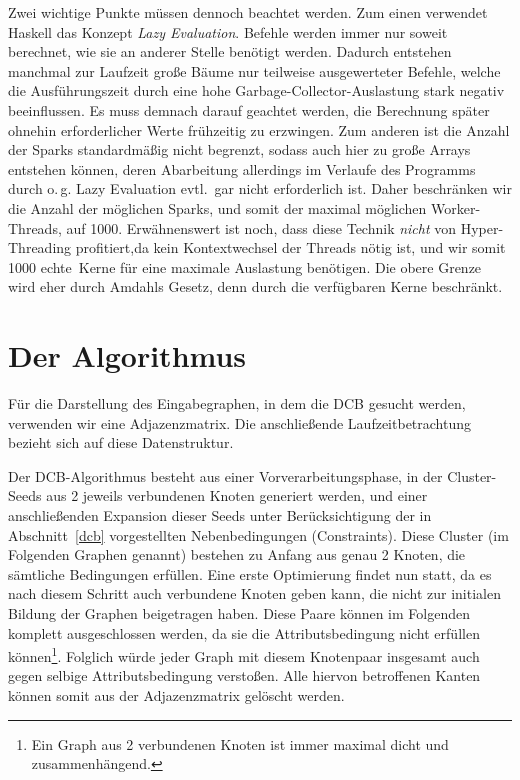 \documentclass[a4paper]{scrartcl}
\newcommand{\en}[1]{\selectlanguage{USenglish}#1\selectlanguage{ngerman}}
\begin{document}
\medskip
Zwei wichtige Punkte müssen dennoch beachtet werden. Zum einen verwendet Haskell das Konzept \emph{\en{Lazy Evaluation}}. Befehle werden immer nur soweit berechnet, wie sie an anderer Stelle benötigt werden. Dadurch entstehen manchmal zur Laufzeit große Bäume nur teilweise ausgewerteter Befehle, welche die Ausführungszeit durch eine hohe Garbage-Collector-Auslastung stark negativ beeinflussen. Es muss demnach darauf geachtet werden, die Berechnung später ohnehin erforderlicher Werte frühzeitig zu erzwingen. Zum anderen ist die Anzahl der Sparks standardmäßig nicht begrenzt, sodass auch hier zu große Arrays entstehen können, deren Abarbeitung allerdings im Verlaufe des Programms durch o.\,g. Lazy Evaluation evtl.\ gar nicht erforderlich ist.
Daher beschränken wir die Anzahl der möglichen Sparks, und somit der maximal möglichen Worker-Threads, auf 1000. Erwähnenswert ist noch, dass diese Technik \emph{nicht} von Hyper-Threading profitiert,da kein Kontextwechsel der Threads nötig ist, und wir somit 1000 \glqq echte\grqq \ Kerne für eine maximale Auslastung benötigen. Die obere Grenze wird eher durch Amdahls Gesetz, denn durch die verfügbaren Kerne beschränkt.\par


\section{Der Algorithmus}

Für die Darstellung des Eingabegraphen, in dem die DCB gesucht werden, verwenden wir eine Adjazenzmatrix. Die anschließende Laufzeitbetrachtung bezieht sich auf diese Datenstruktur. \par
Der DCB-Algorithmus besteht aus einer Vorverarbeitungsphase, in der Cluster-Seeds aus 2 jeweils verbundenen Knoten generiert werden, und einer anschließenden Expansion dieser Seeds unter Berücksichtigung der in Abschnitt~\ref{dcb} vorgestellten Nebenbedingungen (Constraints). Diese Cluster (im Folgenden Graphen genannt) bestehen zu Anfang aus genau 2 Knoten, die sämtliche Bedingungen erfüllen. Eine erste Optimierung findet nun statt, da es nach diesem Schritt auch verbundene Knoten geben kann, die nicht zur initialen Bildung der Graphen beigetragen haben. Diese Paare können im Folgenden komplett ausgeschlossen werden, da sie die Attributsbedingung nicht erfüllen können\footnote{Ein Graph aus 2 verbundenen Knoten ist immer maximal dicht und zusammenhängend.}. Folglich würde jeder Graph mit diesem Knotenpaar insgesamt auch gegen selbige Attributsbedingung verstoßen. Alle hiervon betroffenen Kanten können somit aus der Adjazenzmatrix gelöscht werden.\par
\end{document}
